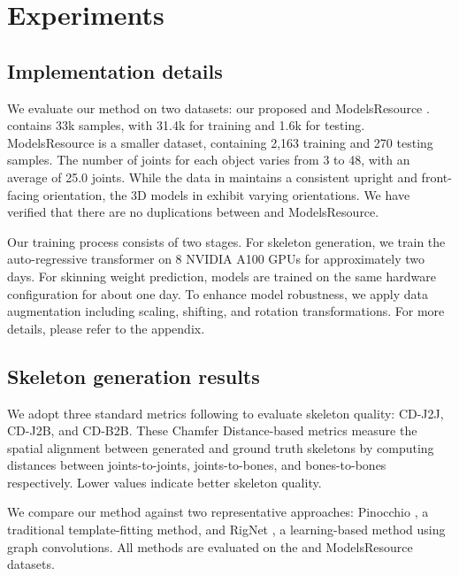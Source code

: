 \section{Experiments}
\subsection{Implementation details}
 We evaluate our method on two datasets: our proposed \ourdata{} and ModelsResource \cite{xu2020rignet, ModelsResource2019}.  \ourdata{} contains 33k samples, with 31.4k for training and 1.6k for testing. ModelsResource is a smaller dataset, containing 2,163 training and 270 testing samples. The number of joints for each object varies from 3 to 48, with an average of 25.0 joints. While the data in \res{} maintains a consistent upright and front-facing orientation, the 3D models in \ourdata{} exhibit varying orientations. We have verified that there are no duplications between \ourdata{} and ModelsResource.

 Our training process consists of two stages. For skeleton generation, we train the auto-regressive transformer on 8 NVIDIA A100 GPUs for approximately two days. For skinning weight prediction, models are trained on the same hardware configuration for about one day. To enhance model robustness, we apply data augmentation including scaling, shifting, and rotation transformations. For more details, please refer to the appendix.

\subsection{Skeleton generation results}
We adopt three standard metrics following \cite{xu2020rignet} to evaluate skeleton quality: CD-J2J, CD-J2B, and CD-B2B. 
These Chamfer Distance-based metrics measure the spatial alignment between generated and ground truth skeletons by computing distances between joints-to-joints, joints-to-bones, and bones-to-bones respectively. Lower values indicate better skeleton quality.


We compare our method against two representative approaches: Pinocchio \cite{baran2007automatic}, a traditional template-fitting method, and RigNet \cite{xu2020rignet}, a learning-based method using graph convolutions. All methods are evaluated on the \ourdata{} and ModelsResource datasets.

